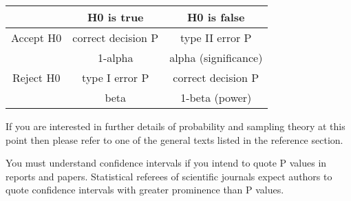 %
%

\begin{center}
\begin{tabular}{|c|c|c|} \hline
& H0 is true &  H0 is false \\ \hline 
Accept H0& correct decision P & type II error P \\ 
& 1-alpha& alpha (significance)\\\hline 
Reject H0& type I error P & correct decision P \\
&beta&1-beta (power)\\ \hline
\end{tabular} 
\end{center}





If you are interested in further details of probability and sampling theory at this point then please refer to one of the general texts listed in the reference section.

You must understand confidence intervals if you intend to quote P values in reports and papers. Statistical referees of scientific journals expect authors to quote confidence intervals with greater prominence than P values.


